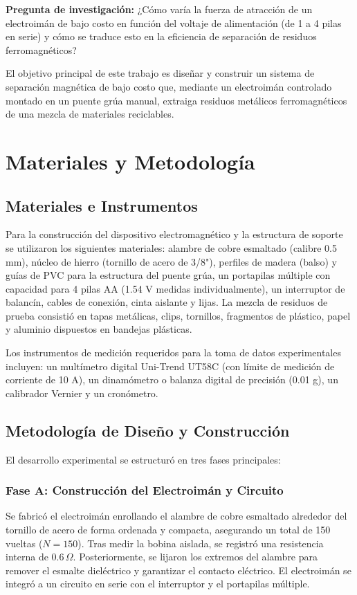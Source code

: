 \textbf{Pregunta de investigación:} ¿Cómo varía la fuerza de atracción de un electroimán de bajo costo en función del voltaje de alimentación (de 1 a 4 pilas en serie) y cómo se traduce esto en la eficiencia de separación de residuos ferromagnéticos?

El objetivo principal de este trabajo es diseñar y construir un sistema de separación magnética de bajo costo que, mediante un electroimán controlado montado en un puente grúa manual, extraiga residuos metálicos ferromagnéticos de una mezcla de materiales reciclables.

\section{Materiales y Metodología}

\subsection{Materiales e Instrumentos}
Para la construcción del dispositivo electromagnético y la estructura de soporte se utilizaron los siguientes materiales: alambre de cobre esmaltado (calibre 0.5 mm), núcleo de hierro (tornillo de acero de 3/8"), perfiles de madera (balso) y guías de PVC para la estructura del puente grúa, un portapilas múltiple con capacidad para 4 pilas AA (1.54 V medidas individualmente), un interruptor de balancín, cables de conexión, cinta aislante y lijas. La mezcla de residuos de prueba consistió en tapas metálicas, clips, tornillos, fragmentos de plástico, papel y aluminio dispuestos en bandejas plásticas.

Los instrumentos de medición requeridos para la toma de datos experimentales incluyen: un multímetro digital Uni-Trend UT58C (con límite de medición de corriente de 10 A), un dinamómetro o balanza digital de precisión (0.01 g), un calibrador Vernier y un cronómetro.

\subsection{Metodología de Diseño y Construcción}
El desarrollo experimental se estructuró en tres fases principales:

\subsubsection{Fase A: Construcción del Electroimán y Circuito}
Se fabricó el electroimán enrollando el alambre de cobre esmaltado alrededor del tornillo de acero de forma ordenada y compacta, asegurando un total de 150 vueltas ($N = 150$). Tras medir la bobina aislada, se registró una resistencia interna de $0.6 \, \Omega$. Posteriormente, se lijaron los extremos del alambre para remover el esmalte dieléctrico y garantizar el contacto eléctrico. El electroimán se integró a un circuito en serie con el interruptor y el portapilas múltiple.

